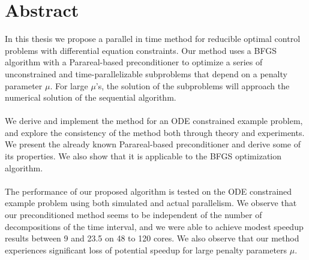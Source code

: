 \chapter*{Abstract}
In this thesis we propose a parallel in time method for reducible optimal control problems with differential equation constraints. Our method uses a BFGS algorithm with a Parareal-based preconditioner to optimize a series of unconstrained and time-parallelizable subproblems that depend on a penalty parameter $\mu$. For large $\mu$'s, the solution of the subproblems will approach the numerical solution of the sequential algorithm.
\\
\\
We derive and implement the method for an ODE constrained example problem, and explore the consistency of the method both through theory and experiments. We present the already known  Parareal-based preconditioner and derive some of its properties. We also show that it is applicable to the BFGS optimization algorithm.
\\
\\
The performance of our proposed algorithm is tested on the ODE constrained example problem using both simulated and actual parallelism. We observe that our preconditioned method seems to be independent of the number of decompositions of the time interval, and we were able to achieve modest speedup results between 9 and 23.5 on 48 to 120 cores. We also observe that our method experiences significant loss of potential speedup for large penalty parameters $\mu$.
